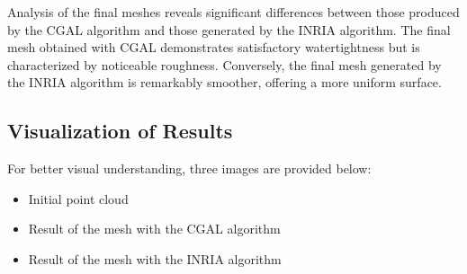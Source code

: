 \documentclass{article}
\begin{document}
Analysis of the final meshes reveals significant differences between those produced by the CGAL algorithm and those generated by the INRIA algorithm. The final mesh obtained with CGAL demonstrates satisfactory watertightness but is characterized by noticeable roughness. Conversely, the final mesh generated by the INRIA algorithm is remarkably smoother, offering a more uniform surface.

\subsection{Visualization of Results}

For better visual understanding, three images are provided below:

\begin{itemize}
    \item Initial point cloud
    \item Result of the mesh with the CGAL algorithm
    \item Result of the mesh with the INRIA algorithm
\end{itemize}
\end{document}
